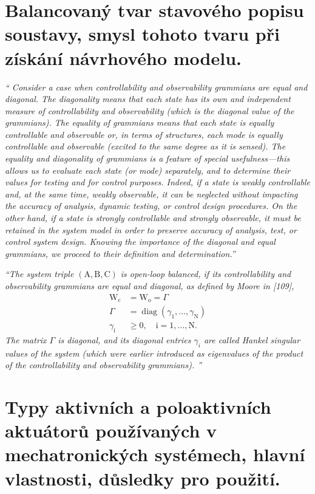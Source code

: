 \documentclass{article}
\begin{document}
	\pagebreak
	\section{Balancovaný tvar stavového popisu soustavy, smysl tohoto tvaru při získání návrhového modelu.}

	\emph{``
	Consider a case when controllability and observability grammians are equal and diagonal. The diagonality means that each state has its own and independent measure of controllability and observability (which is the diagonal value of the grammians). The equality of grammians means that each state is equally controllable and observable or, in terms of structures, each mode is equally controllable and observable (excited to the same degree as it is sensed). The equality and diagonality of grammians is a feature of special usefulness—this allows us to evaluate each state (or mode) separately, and to determine their values for testing and for control purposes. Indeed, if a state is weakly controllable and, at the same time, weakly observable, it can be neglected without impacting the accuracy of analysis, dynamic testing, or control design procedures. On the other hand, if a state is strongly controllable and strongly observable, it must be retained in the system model in order to preserve accuracy of analysis, test, or control system design. Knowing the importance of the diagonal and equal grammians, we proceed to their definition and determination.''}

	\emph{``The system triple $(\mathrm{A}, \mathrm{B}, \mathrm{C})$ is open-loop balanced, if its controllability and observability grammians are equal and diagonal, as defined by Moore in [109],
	$$
	\begin{aligned}
	\mathrm{W}_{\mathrm{c}} &=\mathrm{W}_{\mathrm{o}}=\Gamma \\
	\Gamma &=\operatorname{diag}\left(\gamma_{1}, \ldots, \gamma_{\mathrm{N}}\right) \\
	\gamma_{\mathrm{i}} & \geq 0, \quad \mathrm{i}=1, \ldots, \mathrm{N} .
	\end{aligned}
	$$
	The matrix $\Gamma$ is diagonal, and its diagonal entries $\gamma_{i}$ are called Hankel singular values of the system (which were earlier introduced as eigenvalues of the product of the controllability and observability grammians).
	''}

	\pagebreak
	\section{Typy aktivních a poloaktivních aktuátorů používaných v mechatronických systémech, hlavní vlastnosti, důsledky pro použití.}
\end{document}
